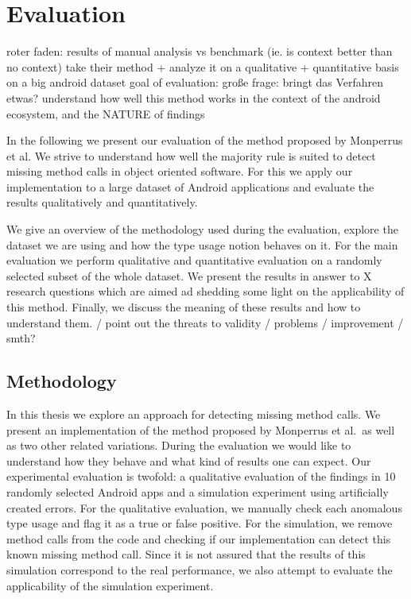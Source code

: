 \chapter{Evaluation}\label{ch:eval}

roter faden: results of manual analysis vs benchmark (ie. is context better than no context)
take their method + analyze it on a qualitative + quantitative basis on a big android dataset
goal of evaluation:
große frage: bringt das Verfahren etwas?
understand how well this method works in the context of the android ecosystem, and the NATURE of findings

In the following we present our evaluation of the method proposed by Monperrus et al.
We strive to understand how well the majority rule is suited to detect missing method calls in object oriented software.
For this we apply our implementation to a large dataset of Android applications and evaluate the results qualitatively and quantitatively. 

We give an overview of the methodology used during the evaluation, explore the dataset we are using and how the type usage notion behaves on it.
For the main evaluation we perform qualitative and quantitative evaluation on a randomly selected subset of the whole dataset.
We present the results in answer to X research questions which are aimed ad shedding some light on the applicability of this method.
Finally, we discuss the meaning of these results and how to understand them.
/ point out the threats to validity / problems / improvement / smth?

\section{Methodology}

In this thesis we explore an approach for detecting missing method calls.
We present an implementation of the method proposed by Monperrus et al.\ as well as two other related variations.
During the evaluation we would like to understand how they behave and what kind of results one can expect.
Our experimental evaluation is twofold: a qualitative evaluation of the findings in 10 randomly selected Android apps and a simulation experiment using artificially created errors.
For the qualitative evaluation, we manually check each anomalous type usage and flag it as a true or false positive.
For the simulation, we remove method calls from the code and checking if our implementation can detect this known missing method call.
Since it is not assured that the results of this simulation correspond to the real performance, we also attempt to evaluate the applicability of the simulation experiment.


